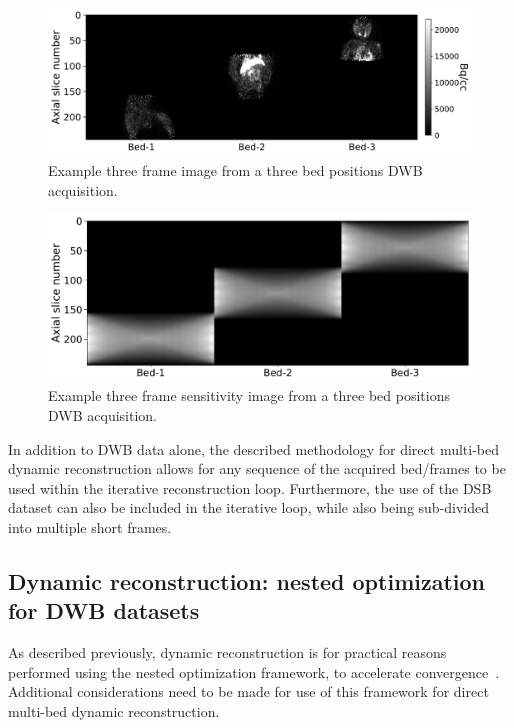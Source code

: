 %
\begin{figure} [h!]
\includegraphics[scale=0.5,angle=0]{3_Results/3_3_DWB_Reconstruction/figures/Macaque_3D.pdf}
\caption{Example three frame image from a three bed positions DWB acquisition.} 
\label{fig_3_3:Macaque}
\end{figure} 
%
\begin{figure} [h!]
\includegraphics[scale=0.42,angle=0]{3_Results/3_3_DWB_Reconstruction/figures/Macaque_Sensitivity.pdf}
\caption{Example three frame sensitivity image from a three bed positions DWB acquisition.} 
\label{fig_3_3:Macaque_Sensitivity}
\end{figure} 
%
In addition to DWB data alone, the described methodology for direct multi-bed dynamic reconstruction allows for any sequence of the acquired bed/frames to be used within the iterative reconstruction loop. Furthermore, the use of the DSB dataset can also be included in the iterative loop, while also being sub-divided into multiple short frames.

\subsection{Dynamic reconstruction: nested optimization for DWB datasets}
As described previously, dynamic reconstruction is for practical reasons performed using the nested optimization framework, to accelerate convergence~\cite{Wang2010,Matthews2010}.
Additional considerations need to be made for use of this framework for direct multi-bed dynamic reconstruction.

